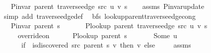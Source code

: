 \begin{isabellebody}
\ \ \ {\isachardoublequoteopen}P{\isacharunderscore}{\kern0pt}invar\ {\isacharparenleft}{\kern0pt}parent\ {\isacharparenleft}{\kern0pt}traverse{\isacharunderscore}{\kern0pt}edge\ src\ u\ v\ s{\isacharparenright}{\kern0pt}{\isacharparenright}{\kern0pt}{\isachardoublequoteclose}%
\endisataginvisible
{\isafoldinvisible}%
%
\isadeliminvisible
\isanewline
%
\endisadeliminvisible
%
\isadelimproof
\ \ %
\endisadelimproof
%
\isatagproof
{}\isamarkupfalse%
\ assms\ P{\isachardot}{\kern0pt}invar{\isacharunderscore}{\kern0pt}update\isanewline
\ \ \isamarkupfalse%
\ {\isacharparenleft}{\kern0pt}simp\ add{\isacharcolon}{\kern0pt}\ traverse{\isacharunderscore}{\kern0pt}edge{\isacharunderscore}{\kern0pt}def{\isacharparenright}{\kern0pt}%
\endisatagproof
{\isafoldproof}%
%
\isadelimproof
\isanewline
%
\endisadelimproof
\isanewline
{}\isamarkupfalse%
\ {\isacharparenleft}{\kern0pt}\ bfs{\isacharparenright}{\kern0pt}\ lookup{\isacharunderscore}{\kern0pt}parent{\isacharunderscore}{\kern0pt}traverse{\isacharunderscore}{\kern0pt}edge{\isacharunderscore}{\kern0pt}cong{\isacharcolon}{\kern0pt}\isanewline
\ \ \ {\isachardoublequoteopen}P{\isacharunderscore}{\kern0pt}invar\ {\isacharparenleft}{\kern0pt}parent\ s{\isacharparenright}{\kern0pt}{\isachardoublequoteclose}\isanewline
\ \ \isanewline
\ \ \ \ {\isachardoublequoteopen}P{\isacharunderscore}{\kern0pt}lookup\ {\isacharparenleft}{\kern0pt}parent\ {\isacharparenleft}{\kern0pt}traverse{\isacharunderscore}{\kern0pt}edge\ src\ u\ v\ s{\isacharparenright}{\kern0pt}{\isacharparenright}{\kern0pt}\ {\isacharequal}{\kern0pt}\isanewline
\ \ \ \ \ override{\isacharunderscore}{\kern0pt}on\isanewline
\ \ \ \ \ \ {\isacharparenleft}{\kern0pt}P{\isacharunderscore}{\kern0pt}lookup\ {\isacharparenleft}{\kern0pt}parent\ s{\isacharparenright}{\kern0pt}{\isacharparenright}{\kern0pt}\isanewline
\ \ \ \ \ \ {\isacharparenleft}{\kern0pt}{\isasymlambda}{\isacharunderscore}{\kern0pt}{\isachardot}{\kern0pt}\ Some\ u{\isacharparenright}{\kern0pt}\isanewline
\ \ \ \ \ \ {\isacharparenleft}{\kern0pt}if\ {\isasymnot}\ is{\isacharunderscore}{\kern0pt}discovered\ src\ {\isacharparenleft}{\kern0pt}parent\ s{\isacharparenright}{\kern0pt}\ v\ then\ {\isacharbraceleft}{\kern0pt}v{\isacharbraceright}{\kern0pt}\ else\ {\isacharbraceleft}{\kern0pt}{\isacharbraceright}{\kern0pt}{\isacharparenright}{\kern0pt}{\isachardoublequoteclose}\isanewline
%
\isadelimproof
\ \ %
\endisadelimproof
%
\isatagproof
{}\isamarkupfalse%
\ assms\isanewline

\end{isabellebody}
